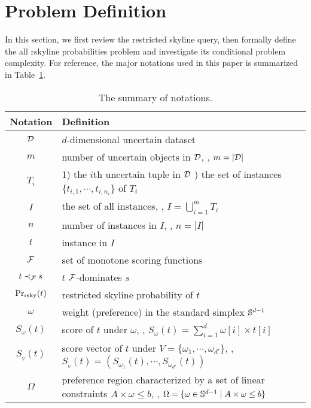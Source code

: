 \section{Problem Definition}\label{sec:preliminary}

In this section, we first review the restricted skyline query, then formally define the all rskyline probabilities problem and investigate its conditional problem complexity.
For reference, the major notations used in this paper is summarized in Table~\ref{table:notaions}.

\begin{table}[t]
	\centering
	\caption{The summary of notations.}\vspace{-2ex}
	\label{table:notaions}
	\begin{tabularx}{\linewidth}{|c|X|}
		\hline
		{\bf Notation} & {\bf Definition} \\ \hline \hline
		$\mathcal{D}$ & $d$-dimensional uncertain dataset \\ \hline
		$m$ & number of uncertain objects in $\mathcal{D}$, \ie, $m = |\mathcal{D}|$ \\ \hline
		$T_i$ & 1) the $i$th uncertain tuple in $\mathcal{D}$ \newline 2) the set of instances $\{t_{i,1}, \cdots, t_{i, n_i}\}$ of $T_i$ \\ \hline
		$I$ & the set of all instances, \ie, $I = \bigcup_{i=1}^m T_i$ \\ \hline
		$n$ & number of instances in $I$, \ie, $n = |I|$ \\ \hline
		$t$ & instance in $I$ \\ \hline
		$\mathcal{F}$ & set of monotone scoring functions \\ \hline
		$t \prec_{\mathcal{F}} s$ & $t$ $\mathcal{F}$-dominates $s$ \\ \hline
		${\rm Pr}_{\rm rsky}(t)$ & restricted skyline probability of $t$ \\ \hline
		$\omega$ & weight (preference) in the standard simplex $\mathbb{S}^{d-1}$ \\ \hline
		$S_\omega(t)$ & score of $t$ under $\omega$, \ie, $S_\omega(t) = \sum^d_{i = 1}\omega[i] \times t[i]$ \\ \hline
		$S_{_V}(t)$ & score vector of $t$ under $V = \{\omega_1, \cdots, \omega_{d'}\}$, \ie, $S_{_V}(t) = (S_{\omega_1}(t), \cdots, S_{\omega_{d'}}(t))$ \\ \hline
		$\Omega$ & preference region characterized by a set of linear constraints $A \times \omega \le b$, \ie, $\Omega = \{\omega \in \mathbb{S}^{d-1} \mid A \times \omega \le b\}$ \\ \hline
    \end{tabularx}
\end{table}

